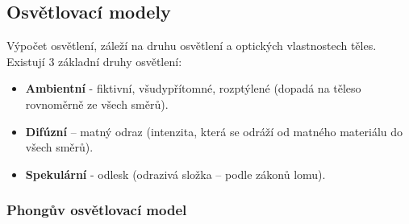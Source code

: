 \subsection{Osvětlovací modely}
Výpočet osvětlení, záleží na druhu osvětlení a optických vlastnostech těles. Existují 3 základní druhy osvětlení:
\begin{itemize}
 	\item \textbf{Ambientní}  - fiktivní, všudypřítomné, rozptýlené (dopadá na těleso rovnoměrně ze všech směrů).
 	\item \textbf{Difúzní} – matný odraz (intenzita, která se odráží od matného materiálu do všech směrů).
 	\item \textbf{Spekulární}  - odlesk (odrazivá složka – podle zákonů lomu).
\end{itemize}
\subsubsection{Phongův osvětlovací model}
